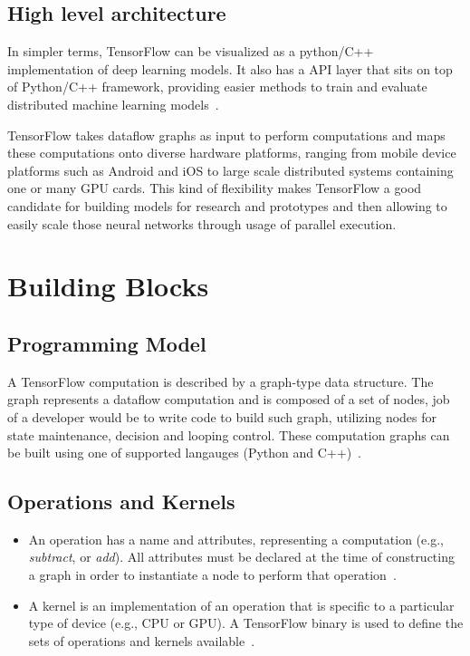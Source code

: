 \subsection{High level architecture}
In simpler terms, TensorFlow can be visualized as a python/C++
implementation of deep learning models. It also has a API layer that
sits on top of Python/C++ framework, providing easier methods to train
and evaluate distributed machine learning
models~\cite{hid-sp18-510-tfblog}. 

TensorFlow takes dataflow graphs as input to perform computations and
maps these computations onto diverse hardware platforms, ranging from
mobile device platforms such as Android and iOS to large scale
distributed systems containing one or many GPU cards. This kind of
flexibility makes TensorFlow a good candidate for building models for
research and prototypes and then allowing to easily scale those neural
networks through usage of parallel execution. 


\section{Building Blocks}
\subsection{Programming Model}
A TensorFlow computation is described by a graph-type data structure.
The graph represents a dataflow computation and is composed of a set
of nodes, job of a developer would be to write code to build such
graph, utilizing nodes for state maintenance, decision and looping
control. These computation graphs can be built using one of supported
langauges (Python and
C++)~\cite{hid-sp18-510-tensorflow2015-whitepaper}.   

\subsection{Operations and Kernels}
\begin{itemize}
	\item An operation has a name and attributes, representing a
computation (e.g., \emph{subtract}, or \emph{add}). All attributes must be
declared at the time of constructing a graph in order to instantiate a
node to perform that
operation~\cite{hid-sp18-510-tensorflow2015-whitepaper}. 
\item A kernel is an implementation of an operation that is specific to a
particular type of device (e.g., CPU or GPU). A TensorFlow binary is
used to define the sets of operations and kernels
available~\cite{hid-sp18-510-tensorflow2015-whitepaper}.
\end{itemize}
